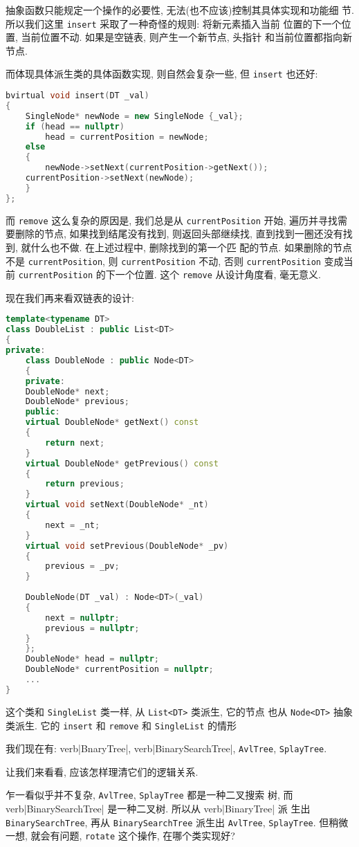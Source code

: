 \documentclass[a4paper]{ctexart}
\theoremstyle{definition}
\theoremstyle{definition}
\begin{document}
抽象函数只能规定一个操作的必要性, 无法(也不应该)控制其具体实现和功能细
节. 所以我们这里 \verb|insert| 采取了一种奇怪的规则: 将新元素插入当前
位置的下一个位置, 当前位置不动. 如果是空链表, 则产生一个新节点, 头指针
和当前位置都指向新节点. 

而体现具体派生类的具体函数实现, 则自然会复杂一些, 但 \verb|insert| 也还好:

\begin{lstlisting}[language=C++]
bvirtual void insert(DT _val)
{
    SingleNode* newNode = new SingleNode {_val};
    if (head == nullptr)
        head = currentPosition = newNode;
    else
    {
        newNode->setNext(currentPosition->getNext());
	currentPosition->setNext(newNode);
    }
};
\end{lstlisting}

而 \verb|remove| 这么复杂的原因是, 我们总是从 \verb|currentPosition|
开始, 遍历并寻找需要删除的节点, 如果找到结尾没有找到, 则返回头部继续找,
直到找到一圈还没有找到, 就什么也不做. 在上述过程中, 删除找到的第一个匹
配的节点. 如果删除的节点不是 \verb|currentPosition|, 则
\verb|currentPosition| 不动, 否则 \verb|currentPosition| 变成当前
\verb|currentPosition| 的下一个位置. 这个 \verb|remove| 从设计角度看,
毫无意义.

现在我们再来看双链表的设计:
\begin{lstlisting}[language=C++]
template<typename DT>
class DoubleList : public List<DT>
{
private:
    class DoubleNode : public Node<DT>
    {
    private:
	DoubleNode* next;
	DoubleNode* previous;
    public:
	virtual DoubleNode* getNext() const
	{
	    return next;
	}
	virtual DoubleNode* getPrevious() const
	{
	    return previous;
	}
	virtual void setNext(DoubleNode* _nt)
	{
	    next = _nt;
	}
	virtual void setPrevious(DoubleNode* _pv)
	{
	    previous = _pv;
	}
		
	DoubleNode(DT _val) : Node<DT>(_val)
	{
	    next = nullptr;
	    previous = nullptr;
	}
    };
    DoubleNode* head = nullptr;
    DoubleNode* currentPosition = nullptr;
    ...
}
\end{lstlisting}

这个类和 \verb|SingleList| 类一样, 从 \verb|List<DT>| 类派生, 它的节点
也从 \verb|Node<DT>| 抽象类派生. 它的 \verb|insert| 和 \verb|remove| 和 \verb|SingleList| 的情形

我们现在有: verb|BnaryTree|,
verb|BinarySearchTree|, \verb|AvlTree|, \verb|SplayTree|.

让我们来看看, 应该怎样理清它们的逻辑关系.

乍一看似乎并不复杂, \verb|AvlTree|, \verb|SplayTree| 都是一种二叉搜索
树, 而 verb|BinarySearchTree| 是一种二叉树. 所以从 verb|BinaryTree| 派
生出 \verb|BinarySearchTree|, 再从 \verb|BinarySearchTree| 派生出
\verb|AvlTree|, \verb|SplayTree|. 但稍微一想, 就会有问题,
\verb|rotate| 这个操作, 在哪个类实现好?
\end{document}
